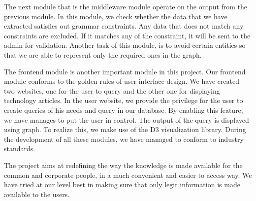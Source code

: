 \par
The next module that is the middleware module operate on the output from the previous module.
In this module, we check whether the data that we have extracted satisfies out grammar constraints. Any data that does not match any constraints are excluded. If it matches any of the constraint, it will be sent to the admin for validation. Another task of this module, is to avoid certain entities so that we are able to represent only the required ones in the graph. 
\par
The frontend module is another important module in this project. Our frontend module conforms to the golden rules of user interface design. We have created two websites, one for the user to query and the other one for displaying technology articles. In the user website, we provide the privilege for the user to create queries of his needs and query in our database. By enabling this feature, we have manages to put the user in control. The output of the query is displayed using graph. To realize this, we make use of the D3 visualization library. During the development of all these modules, we have managed to conform to industry standards.
\par
The project aims at redefining the way the knowledge is made available for the common and corporate people, in a much convenient and easier to access way. We have tried at our level best in making sure that only legit information is made available to the users.
